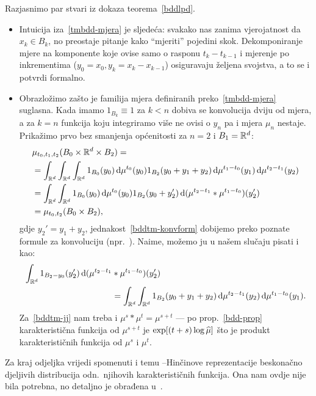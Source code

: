 \documentclass[main.tex]{subfiles}
\begin{document}
\begin{komentar} \label{tmbdd-komentar}
	Razjasnimo par stvari iz dokaza teorema~\ref{bddlpd}.
	\begin{itemize}
		\item Intuicija iza~\eqref{tmbdd-mjera} je sljedeća: svakako nas zanima
		      vjerojatnost da \( x_k \in B_k \), no preostaje pitanje kako \enquote{mjeriti} pojedini skok.
		      Dekomponiranje mjere na komponente koje ovise samo o rasponu \( t_k-t_{k-1} \) i mjerenje po
		      inkrementima (\( y_0=x_0, y_k = x_k-x_{k-1} \)) osiguravaju željena svojstva, a to se i
		      potvrdi formalno.

		\item Obrazložimo zašto je familija mjera definiranih preko~\eqref{tmbdd-mjera} suglasna.
		      Kada imamo \( 1_{B_k} \equiv 1 \) za \( k < n \) dobiva se konvolucija dviju od mjera, a za \( k = n \)
		      funkcija koju integriramo više ne ovisi o \( y_n \) pa i mjera \( \mu_n \) nestaje. Prikažimo prvo bez smanjenja općenitosti za \( n = 2 \) i \( B_1 = \mathbb{R}^d \):
		      \begin{align}
			       & \mu_{t_0, t_1, t_2}(B_0 \times \mathbb{R}^d \times B_2) =                                                                                         \\
			       & = \int_{\mathbb{R}^d}\int_{\mathbb{R}^d}\int_{\mathbb{R}^d} 1_{B_0}(y_0) \,\mathrm d \mu^{t_0} (y_0) 1_{B_2}(y_0+y_1+y_2) \,\mathrm d \mu^{t_1-t_0}(y_1) \,\mathrm d \mu^{t_2-t_1}(y_2)      \\
			       & = \int_{\mathbb{R}^d} \int_{\mathbb{R}^d} 1_{B_0}(y_0) \,\mathrm d \mu^{t_0}(y_0) 1_{B_2}(y_0+y_2') \,\mathrm d (\mu^{t_2-t_1}*\mu^{t_1-t_0})(y_2')  \label{bddtm-konvform} \\
			       & = \mu_{t_0, t_2}(B_0 \times B_2) \label{bddtm-jj},
		      \end{align}
		      gdje \( y_2' = y_1 + y_2 \), jednakost~\eqref{bddtm-konvform} dobijemo preko poznate formule za konvoluciju (npr.~\cite[,~(6)]{sarapa}). Naime, možemo ju u našem slučaju pisati
		      i kao:
		      \begin{equation}
			      \begin{aligned}
				      \int_{\mathbb{R}^d} 1_{B_2-y_0} (y_2')\,\mathrm d (\mu^{t_2-t_1} & * \mu^{t_1-t_0})(y_2')                                                                       \\
				                                                      & =  \int_{\mathbb{R}^d} \int_{\mathbb{R}^d} 1_{B_2}(y_0+y_1+y_2) \,\mathrm d \mu^{t_2-t_1}(y_2) \,\mathrm d \mu^{t_1-t_0}(y_1).
			      \end{aligned}
		      \end{equation}
		      Za~\eqref{bddtm-jj} nam treba i \( \mu^s * \mu^t = \mu^{s+t} \) --- po prop.~\ref{bdd-prop} karakteristična funkcija od
		      \( \mu^{s+t} \) je \( \exp[(t+s) \log \widehat{\mu}] \) što je produkt karakterističnih funkcija od \( \mu^s \) i \( \mu^t \).
	\end{itemize}
\end{komentar}

Za kraj odjeljka vrijedi spomenuti i temu \levy --Hinčinove reprezentacije beskonačno djeljivih distribucija odn.\
njihovih karakterističnih funkcija. Ona nam ovdje nije bila potrebna, no detaljno je
obrađena u~\cite[\textsection 8]{sato}.
\end{document}
